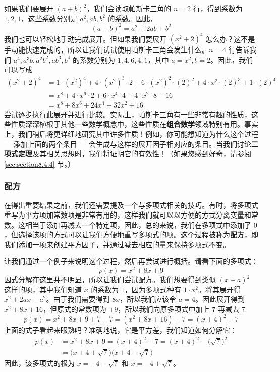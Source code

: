 如果我们要展开 $(a + b)^2$，我们会读取帕斯卡三角的 $n = 2$ 行，得到系数为 $1, 2, 1$，这些系数分别是 $a^2, ab, b^2$ 的系数。因此，
\[(a + b)^2 = a^2 + 2ab + b^2\]
我们也可以轻松地手动完成展开。但如果我们要展开 $(x^2+2)^4$ 怎么办？这不是手动能快速完成的，所以让我们试试使用帕斯卡三角会发生什么。$n = 4$ 行告诉我们 $a^4, a^3b, a^2b^2, ab^3, b^4$ 的系数分别为 $1, 4, 6, 4, 1$，其中 $a = x^2, b = 2$。因此，我们可以写成
\begin{align*}
    (x^2+2)^4 &=  1 \cdot (x^2)^4 + 4 \cdot (x^2)^3 \cdot 2 + 6 \cdot (x^2)^2 \cdot (2)^2 + 4 \cdot x^2 \cdot (2)^3 + 1 \cdot (2)^4 \\
    &=  x^8 + 4 \cdot x^6 \cdot 2 + 6 \cdot x^4 \cdot 4 + 4 \cdot x^2 \cdot 8 + 16 \\
    &= x^8 + 8x^6 + 24x^4 + 32x^2 + 16
\end{align*}
尝试逐步执行此展开并进行比较。实际上，帕斯卡三角有一些非常有趣的性质，这些性质深深植根于其他一些数学概念中，这些性质在\textbf{组合数学}领域特别有用。事实上，我们稍后将更详细地研究其中许多性质！例如，你可能想知道为什么这个过程 --- 添加上面的两个条目 --- 会生成与这样的展开因子相对应的条目。当我们讨论\textbf{二项式定理}及其相关思想时，我们将证明它的有效性！（如果您感到好奇，请参阅 \ref{sec:section8.4.4} 节。）

\subsubsection*{配方}

在得出重要结果之前，我们还需要提及一个与多项式相关的技巧。有时，将多项式重写为平方项加常数项是非常有用的，这样我们就可以以方便的方式分离变量和常数。这相当于添加再减去一个特定项，因此，总的来说，我们在多项式中添加了 $0$，但选择该项的方式可以让我们方便地重写多项式的项。这个过程被称为\textbf{配方}，即我们添加一项来创建平方因子，并通过减去相应的量来保持多项式不变。

让我们通过一个例子来说明这个过程，然后再尝试进行概括。请看下面的多项式：
\[p(x) = x^2 + 8x + 9\]
因式分解在这里并不明显，所以让我们尝试配方。我们想要得到类似 $(x + a)^2$ 这样的项，其中我们知道 $x$ 的系数为 $1$，因为多项式种有 $1 \cdot x^2$。将其展开得 $x^2+2ax+a^2$。由于我们需要得到 $8x$，所以我们应该令 $a = 4$。因此展开得到 $x^2 + 8x + 16$，但原式的常数项为 $+9$，所以我们向原多项式中加上 $7$ 再减去 $7$: 
\[p(x) = x^2 + 8x + 9 + 7 - 7 = (x^2 + 8x + 16) - 7 = (x + 4)^2 - 7\]
上面的式子看起来眼熟吗？准确地说，它是平方差，我们知道如何分解它：
\begin{align*}
    p(x) &= x^2 + 8x + 9 = (x + 4)^2 - 7 = (x + 4)^2 - \Big(\sqrt 7\Big)^2 \\
    &= \Big(x+4+\sqrt 7\Big)\Big(x+4-\sqrt 7\Big)
\end{align*}
因此，该多项式的根为 $x=-4-\sqrt 7$ 和 $x=-4+\sqrt 7$。

